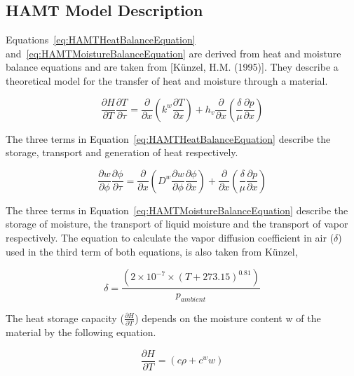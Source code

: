 \subsection{HAMT Model Description}\label{hamt-model-description}

Equations~\ref{eq:HAMTHeatBalanceEquation} and~\ref{eq:HAMTMoistureBalanceEquation} are derived from heat and moisture balance equations and are taken from {[}Künzel, H.M. (1995){]}. They describe a theoretical model for the transfer of heat and moisture through a material.

\begin{equation}
\frac{{\partial H}}{{\partial T}}\frac{{\partial T}}{{\partial \tau }} = \frac{\partial }{{\partial x}}\left( {{k^w}\frac{{\partial T}}{{\partial x}}} \right) + {h_v}\frac{\partial }{{\partial x}}\left( {\frac{\delta }{\mu }\frac{{\partial p}}{{\partial x}}} \right)
\label{eq:HAMTHeatBalanceEquation}
\end{equation}

The three terms in Equation~\ref{eq:HAMTHeatBalanceEquation} describe the storage, transport and generation of heat respectively.

\begin{equation}
\frac{{\partial w}}{{\partial \phi }}\frac{{\partial \phi }}{{\partial \tau }} = \frac{\partial }{{\partial x}}\left( {{D^w}\frac{{\partial w}}{{\partial \phi }}\frac{{\partial \phi }}{{\partial x}}} \right) + \frac{\partial }{{\partial x}}\left( {\frac{\delta }{\mu }\frac{{\partial p}}{{\partial x}}} \right)
\label{eq:HAMTMoistureBalanceEquation}
\end{equation}

The three terms in Equation~\ref{eq:HAMTMoistureBalanceEquation} describe the storage of moisture, the transport of liquid moisture and the transport of vapor respectively. The equation to calculate the vapor diffusion coefficient in air (\(\delta\)) used in the third term of both equations, is also taken from Künzel,

\begin{equation}
\delta  = \frac{{\left( {2 \times {{10}^{ - 7}} \times {{\left( {T + 273.15} \right)}^{0.81}}} \right)}}{{{p_{ambient}}}}
\end{equation}

The heat storage capacity (\(\frac{\partial H}{\partial T}\)) depends on the moisture content w of the material by the following equation.

\begin{equation}
\frac{{\partial H}}{{\partial T}} = \left( {c\rho  + {c^w}w} \right)
\end{equation}

